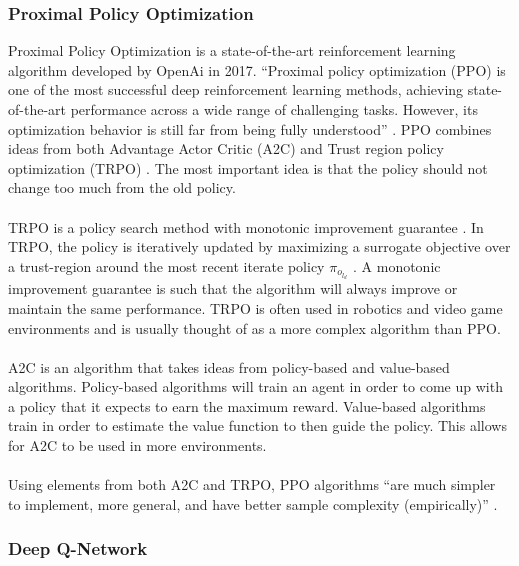 \documentclass[a4paper,12pt]{article}
\begin{document}
\subsubsection{Proximal Policy Optimization}
Proximal Policy Optimization \cite{SchulmanPPO} is a state-of-the-art reinforcement learning algorithm developed by OpenAi in 2017. ``Proximal policy optimization (PPO) is one of the most successful deep reinforcement learning methods, achieving state-of-the-art performance across a wide range of challenging tasks. However, its optimization behavior is still far from being fully understood'' \cite{Wang}. PPO combines ideas from both Advantage Actor Critic (A2C) and Trust region policy optimization (TRPO) \cite{SchulmanPPO}. The most important idea is that the policy should not change too much from the old policy.
\\\\
TRPO is a policy search method with monotonic improvement guarantee \cite{SchulmanTRPO}. In TRPO, the policy is iteratively updated by maximizing a surrogate objective over a trust-region around the most recent iterate policy $\pi_o_l_d$ \cite{Li}. A monotonic improvement guarantee is such that the algorithm will always improve or maintain the same performance. TRPO is often used in robotics and video game environments and is usually thought of as a more complex algorithm than PPO.
\\\\
A2C is an algorithm that takes ideas from policy-based and value-based algorithms. Policy-based algorithms will train an agent in order to come up with a policy that it expects to earn the maximum reward. Value-based algorithms train in order to estimate the value function to then guide the policy. This allows for A2C to be used in more environments. 
\\\\
Using elements from both A2C and TRPO, PPO algorithms ``are much simpler to implement, more general, and have better sample complexity (empirically)'' \cite{SchulmanPPO}. 

\subsubsection{Deep Q-Network}
\end{document}
